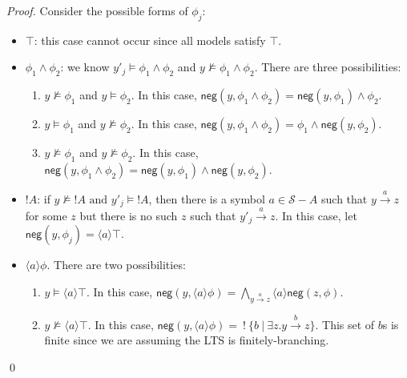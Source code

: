\documentclass[smallextended]{svjour3}       %
\numberwithin{subcase}{mycase}
\def\fBang {\ ! \ }
\def\fOr {\ | \ }
\begin{document}
\begin{proof}
Consider the possible forms of $\phi_j$:
\begin{itemize}
\item
$\top$: this case cannot occur since all models satisfy $\top$.
\item
$\phi_1 \land \phi_2$: we know $y'_j \models \phi_1 \land \phi_2$ and $y \nvDash \phi_1 \land \phi_2$. There are three possibilities:
\begin{enumerate}
\item
$y \nvDash \phi_1$ and $y \models \phi_2$. In this case, $\mathsf{neg}(y, \phi_1 \land \phi_2) = \mathsf{neg}(y, \phi_1) \land \phi_2$.
\item
$y \models \phi_1$ and $y \nvDash \phi_2$. In this case, $\mathsf{neg}(y, \phi_1 \land \phi_2) = \phi_1 \land \mathsf{neg}(y, \phi_2)$.
\item
$y \nvDash \phi_1$ and $y \nvDash \phi_2$. In this case, $\mathsf{neg}(y, \phi_1 \land \phi_2) =  \mathsf{neg}(y, \phi_1) \land \mathsf{neg}(y, \phi_2)$.
\end{enumerate}
\item
$!A$: if $y \nvDash !A \mbox{ and } y'_j \models !A$, then there is a symbol $a \in \mathcal{S}-A$ such that $y \xrightarrow{a} z$ for some $z$ but there is no such $z$ such that $y'_j \xrightarrow{a} z$. In this case, let $\mathsf{neg}(y, \phi_j) = \langle a \rangle \top$.
\item
$\langle a \rangle \phi$. There are two possibilities:
\begin{enumerate}
\item
$y \models \langle a \rangle \top$. In this case, $\mathsf{neg}(y, \langle a \rangle \phi) =  \bigwedge\limits_{y \xrightarrow{a} z}  \langle a \rangle \mathsf{neg}(z, \phi)$.
\item
$y \nvDash \langle a \rangle \top$. In this case, $\mathsf{neg}(y, \langle a \rangle \phi) = \fBang \{ b \fOr \exists z. y \xrightarrow{b} z\}$. This set of $b$s is finite since we are assuming the LTS is finitely-branching.
\end{enumerate}
\end{itemize}
\qed
\end{proof}
\end{document}
